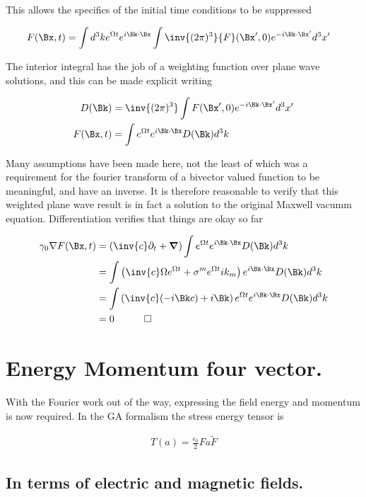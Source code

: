 \documentclass[]{eliblog}
\begin{document}
This allows the specifics of the initial time conditions to be suppressed

\begin{align}
F(\Bx,t) &= \int d^3 k e^{\Omega t} e^{i \Bk \cdot \Bx} \int \inv{(2\pi)^3} {F}(\Bx',0) e^{-i \Bk \cdot \Bx'}  d^3 x'
\end{align}

The interior integral has the job of a weighting function over plane wave solutions, and this can be made explicit writing

\begin{align}
D(\Bk) &= \inv{(2\pi)^3} \int {F}(\Bx',0) e^{-i \Bk \cdot \Bx'}  d^3 x' \\
F(\Bx,t) &= \int e^{\Omega t} e^{i \Bk \cdot \Bx} D(\Bk) d^3 k
\end{align}

Many assumptions have been made here, not the least of which was a requirement for the fourier transform of a bivector valued function to be meaningful, and have an inverse.  It is therefore reasonable to verify that this weighted plane wave result is in fact a solution to the original Maxwell vacumm equation.  Differentiation verifies that things are okay so far

\begin{align*}
\gamma_0 \grad F(\Bx,t)
&=
\left(\inv{c}\partial_t + \spacegrad \right)\int e^{\Omega t} e^{i \Bk \cdot \Bx} D(\Bk) d^3 k \\
&=
\int \left(\inv{c}\Omega e^{\Omega t} + \sigma^m e^{\Omega t} i k_m \right) e^{i \Bk \cdot \Bx} D(\Bk) d^3 k \\
&=
\int \left(\inv{c}(-i \Bk c) + i \Bk \right) e^{\Omega t} e^{i \Bk \cdot \Bx} D(\Bk) d^3 k \\
&= 0 \quad\quad\quad\square
\end{align*}

\section{Energy Momentum four vector.}

With the Fourier work out of the way, expressing the field energy and momentum is now required.  In the GA
formalism the stress energy tensor is

\begin{align}
T(a) = \frac{\epsilon_0}{2} F a \tilde{F}
\end{align}

\subsection{ In terms of electric and magnetic fields. }
\end{document}
